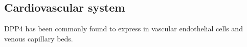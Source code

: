 \subsection{Cardiovascular system}
DPP4 has been commonly found to express in vascular endothelial cells and venous capillary beds. ~